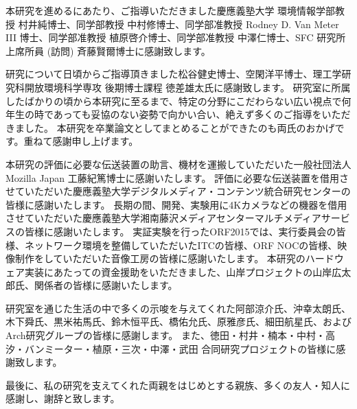 \begin{acknowledgment}

本研究を進めるにあたり、ご指導いただきました慶應義塾大学 環境情報学部教授 村井純博士、同学部教授 中村修博士、同学部准教授 Rodney D. Van Meter III 博士、同学部准教授 植原啓介博士、同学部准教授 中澤仁博士、SFC 研究所 上席所員 (訪問) 斉藤賢爾博士に感謝致します。

研究について日頃からご指導頂きました松谷健史博士、空閑洋平博士、理工学研究科開放環境科学専攻 後期博士課程 徳差雄太氏に感謝致します。
研究室に所属したばかりの頃から本研究に至るまで、特定の分野にこだわらない広い視点で何年生の時であっても妥協のない姿勢で向かい合い、絶えず多くのご指導をいただきました。
本研究を卒業論文としてまとめることができたのも両氏のおかげです。重ねて感謝申し上げます。

本研究の評価に必要な伝送装置の助言、機材を運搬していただいた一般社団法人 Mozilla Japan 工藤紀篤博士に感謝いたします。
評価に必要な伝送装置を借用させていただいた慶應義塾大学デジタルメディア・コンテンツ統合研究センターの皆様に感謝いたします。
長期の間、開発、実験用に4Kカメラなどの機器を借用させていただいた慶應義塾大学湘南藤沢メディアセンターマルチメディアサービスの皆様に感謝いたします。
実証実験を行ったORF2015では、実行委員会の皆様、ネットワーク環境を整備していただいたITCの皆様、ORF NOCの皆様、映像制作をしていただいた音像工房の皆様に感謝いたします。
本研究のハードウェア実装にあたっての資金援助をいただきました、山岸プロジェクトの山岸広太郎氏、関係者の皆様に感謝いたします。

研究室を通じた生活の中で多くの示唆を与えてくれた阿部涼介氏、沖幸太朗氏、木下舜氏、黒米祐馬氏、鈴木恒平氏、橋佑允氏、原雅彦氏、細田航星氏、およびArch研究グループの皆様に感謝します。
また、徳田・村井・楠本・中村・高汐・バンミーター・植原・三次・中澤・武田 合同研究プロジェクトの皆様に感謝致します。

最後に、私の研究を支えてくれた両親をはじめとする親族、多くの友人・知人に感謝し、謝辞と致します。

\end{acknowledgment}
